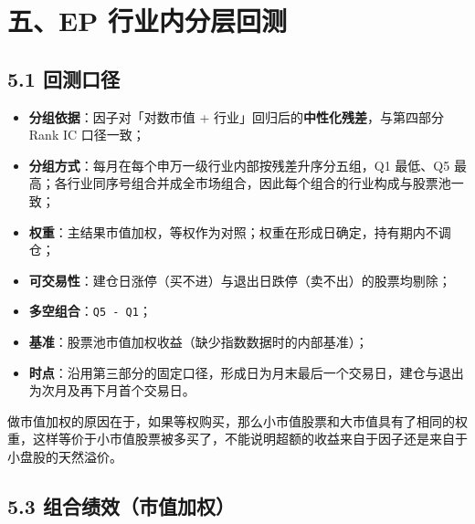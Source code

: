 \documentclass[UTF8,a4paper,11pt]{ctexart}
\begin{document}
{}
\section*{五、EP 行业内分层回测}

{}
\subsection*{5.1 回测口径}

\begin{itemize}[leftmargin=2em,itemsep=2pt,topsep=3pt]
\item 
\textbf{分组依据}：因子对「对数市值 + 行业」回归后的\textbf{中性化残差}，与第四部分 Rank IC 口径一致；

\item 
\textbf{分组方式}：每月在每个申万一级行业内部按残差升序分五组，Q1 最低、Q5 最高；各行业同序号组合并成全市场组合，因此每个组合的行业构成与股票池一致；

\item 
\textbf{权重}：主结果市值加权，等权作为对照；权重在形成日确定，持有期内不调仓；

\item 
\textbf{可交易性}：建仓日涨停（买不进）与退出日跌停（卖不出）的股票均剔除；

\item 
\textbf{多空组合}：\texttt{Q5 - Q1}；

\item 
\textbf{基准}：股票池市值加权收益（缺少指数数据时的内部基准）；

\item 
\textbf{时点}：沿用第三部分的固定口径，形成日为月末最后一个交易日，建仓与退出为次月及再下月首个交易日。

\end{itemize}

做市值加权的原因在于，如果等权购买，那么小市值股票和大市值具有了相同的权重，这样等价于小市值股票被多买了，不能说明超额的收益来自于因子还是来自于小盘股的天然溢价。

{}
\subsection*{5.3 组合绩效（市值加权）}
\end{document}
